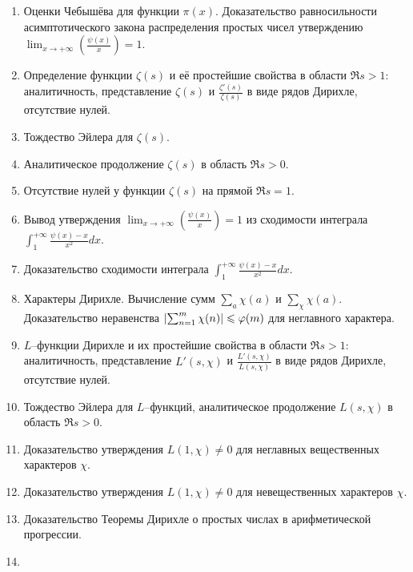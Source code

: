 \begin{enumerate}[%
  label={\arabic*.},%
  itemsep=4pt,%
  parsep=2pt%
]
    \item  %
        Оценки Чебышёва для функции $\pi(x)$. 
        Доказательство равносильности асимптотического закона распределения простых чисел утверждению $\lim_{x \to +\infty} \left( \frac{\psi(x)}{x} \right) = 1$.
    \item  %
        Определение функции $\zeta(s)$ и её простейшие свойства в области $\Re{s} > 1$: аналитичность, представление $\zeta(s)$ и $\frac{\zeta'(s)}{\zeta(s)}$ в виде рядов Дирихле, отсутствие нулей.
    \item  %
        Тождество Эйлера для $\zeta(s)$.
    \item  %
        Аналитическое продолжение $\zeta(s)$ в область $\Re{s} > 0$.
    \item  %
        Отсутствие нулей у функции $\zeta(s)$ на прямой $\Re{s} = 1$.
    \item  %
        Вывод утверждения $\lim_{x \to +\infty} \left( \frac{\psi(x)}{x} \right) = 1$ из сходимости интеграла $\int_{1}^{+\infty} \frac{\psi(x) - x}{x^2}dx$.
    \item  %
        Доказательство сходимости интеграла $\int_{1}^{+\infty} \frac{\psi(x) - x}{x^2}dx$.
    \item  %
        Характеры Дирихле. Вычисление сумм $\sum_a \chi(a)$ и $\sum_\chi \chi(a)$. 
        Доказательство неравенства $\left| \sum_{n=1}^{m} \chi(n) \right| \leqslant \varphi(m)$ для неглавного характера.
    \item  %
        $L$--функции Дирихле и их простейшие свойства в области $\Re{s} > 1$: аналитичность, представление $L'(s, \chi)$ и $\frac{L'(s, \chi)}{L(s, \chi)}$ в виде рядов Дирихле, отсутствие нулей.
    \item  %
        Тождество Эйлера для $L$--функций, аналитическое продолжение $L(s, \chi)$ в область ${\Re{s} > 0}$.
    \item  %
        Доказательство утверждения $L(1, \chi) \ne 0$ для неглавных вещественных характеров $\chi$.
    \item  %
        Доказательство утверждения $L(1, \chi) \ne 0$ для невещественных характеров $\chi$.
    \item  %
        Доказательство Теоремы Дирихле о простых числах в арифметической прогрессии.
    \item  %

\end{enumerate}
